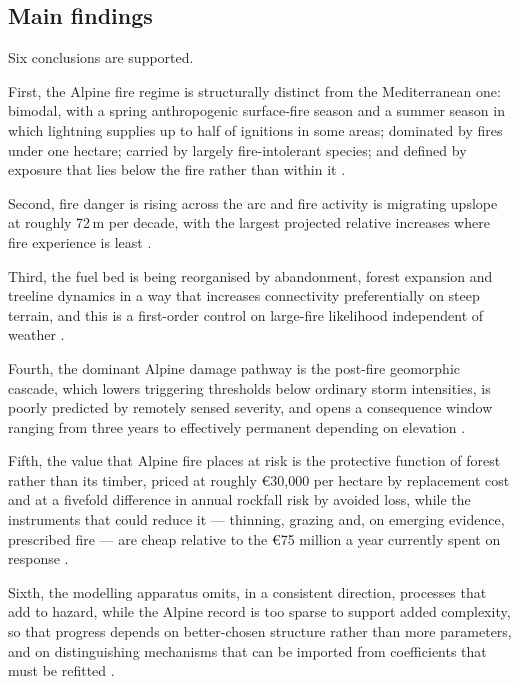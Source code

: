 \documentclass[11pt,a4paper]{article}
\begin{document}
\subsection{Main findings}

Six conclusions are supported.

First, the Alpine fire regime is structurally distinct from the Mediterranean one: bimodal, with a spring anthropogenic surface-fire season and a summer season in which lightning supplies up to half of ignitions in some areas; dominated by fires under one hectare; carried by largely fire-intolerant species; and defined by exposure that lies below the fire rather than within it \citep{muller_forest_2020, valese_wildfires_2011, bercak_combination_2024, mutterer_bark_2026}.

Second, fire danger is rising across the arc and fire activity is migrating upslope at roughly 72\,m per decade, with the largest projected relative increases where fire experience is least \citep{beloiu_climatedriven_2026, gerberding_mapping_2025, miller_climate_2024}.

Third, the fuel bed is being reorganised by abandonment, forest expansion and treeline dynamics in a way that increases connectivity preferentially on steep terrain, and this is a first-order control on large-fire likelihood independent of weather \citep{frei_evidence_2023, stritih_alternative_2023, conedera_linking_2024}.

Fourth, the dominant Alpine damage pathway is the post-fire geomorphic cascade, which lowers triggering thresholds below ordinary storm intensities, is poorly predicted by remotely sensed severity, and opens a consequence window ranging from three years to effectively permanent depending on elevation \citep{laporta_postwildfire_2025, negri_wildfire_2026, degiuli_arrested_2024, moos_climate_2021}.

Fifth, the value that Alpine fire places at risk is the protective function of forest rather than its timber, priced at roughly €30{,}000 per hectare by replacement cost and at a fivefold difference in annual rockfall risk by avoided loss, while the instruments that could reduce it --- thinning, grazing and, on emerging evidence, prescribed fire --- are cheap relative to the €75 million a year currently spent on response \citep{accastello_asforesee_2019, moos_climate_2021, muller_forest_2020, gamba_prescribed_2025}.

Sixth, the modelling apparatus omits, in a consistent direction, processes that add to hazard, while the Alpine record is too sparse to support added complexity, so that progress depends on better-chosen structure rather than more parameters, and on distinguishing mechanisms that can be imported from coefficients that must be refitted \citep{conedera_linking_2024, de_angelis_modelling_2015, diakakis_exploring_2023, cardil_assessing_2025}.
\end{document}
